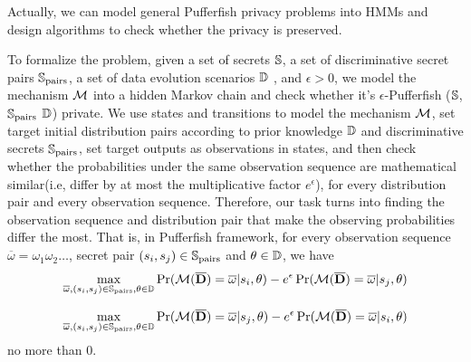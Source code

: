 \iffalse
Actually, we formulate the above Pufferfish privacy cases into Hidden Markov Models.
For instance, in \textit{Example 3}, the state space consists of ($0, 1, 2, \underline{0}, \underline{1}, \underline{2}$).
The states $\underline{0}$, $\underline{1}$ and $\underline{2}$ emit, with certainty,
observation $\textit{zero}$, $\textit{one}$ and $\textit{two}$ respectively.
Even though the attacker has the prior knowledge that the disease is contagious,
we want to make sure that he won't infer whether any member in the data set
has contracted the disease or not. Thus the initial distribution pair the attacker gets would be
($1,0,0,0,0,0$) and ($0,0,1,0,0,0$). And since the probabilities of observing
$\textit{zero}$ are $\frac{2}{3}$ and $\frac{1}{6}$, this violates $\ln(2)$-Pufferfish privacy.
\fi

Actually, we can model general Pufferfish privacy problems into HMMs and
design algorithms to check whether the privacy is preserved.

To formalize the problem, given a set of secrets $\mathbb{S}$,
a set of discriminative secret pairs $\mathbb{S}_{\textmd{pairs}}$, a set of data evolution
scenarios $\mathbb{D}$ , and $\epsilon > 0$, we model the mechanism  $\mathcal{M}$ into a hidden Markov chain
and check whether it's $\epsilon$-Pufferfish ($\mathbb{S}$, $\mathbb{S}_{\textmd{pairs}}$
$\mathbb{D}$) private. We use states and transitions to model the mechanism $\mathcal{M}$,
set target initial distribution pairs according to prior knowledge $\mathbb{D}$ and discriminative secrets $\mathbb{S}_{\textmd{pairs}}$,
set target outputs as observations in states, and then check whether the probabilities under the same observation sequence
are mathematical similar(i.e, differ by at most the multiplicative factor $e^{\epsilon}$), for every distribution pair and every observation sequence.
Therefore, our task turns into finding the observation sequence and distribution pair that make the observing probabilities differ the most.
That is, in Pufferfish framework, for every observation sequence $\overline{\omega}=\omega_1\omega_2\ldots$, secret pair $(s_i, s_j) \in
\mathbb{S}_{\textmd{pairs}}$ and $\theta \in \mathbb{D}$, we have
  \begin{equation}\label{max1}
     \max_{\overline{\omega},(s_i, s_j) \in
    \mathbb{S}_{\textmd{pairs}},\theta \in \mathbb{D}}
    { \Pr (\mathcal{M} (\overline{\mathbf{D}}) = \overline{\omega}| s_i, \theta) - e^\epsilon \Pr (\mathcal{M} (\overline{\mathbf{D}}) = \overline{\omega}| s_j, \theta) }
  \end{equation}

  \begin{equation}\label{max2}
     \max_{\overline{\omega},(s_i, s_j) \in
    \mathbb{S}_{\textmd{pairs}},\theta \in \mathbb{D}}
     { \Pr (\mathcal{M} (\overline{\mathbf{D}}) = \overline{\omega}| s_j, \theta) - e^\epsilon \Pr (\mathcal{M} (\overline{\mathbf{D}}) = \overline{\omega}| s_i, \theta) }
  \end{equation}
no more than $0$.


